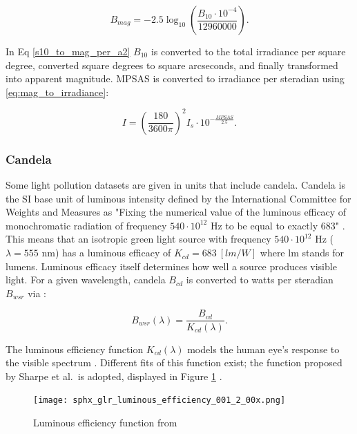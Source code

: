 \begin{equation} \label{s10_to_mag_per_a2}
	B_{mag} = -2.5 \log_{10}\left( \frac{B_{10} \cdot 10^{-4}}{12960000} \right).
\end{equation}

In Eq \ref{s10_to_mag_per_a2} $B_{10}$ is converted to the total irradiance per square degree,
converted square degrees to square arcseconds, and finally transformed into apparent magnitude. MPSAS is converted to irradiance per steradian using \ref{eq:mag_to_irradiance}:

\begin{equation} \label{eq:mpsas_to_irrad_per_ster}
  I = \left( \frac{180}{ 3600\pi} \right)^2 I_s \cdot 10^{-\frac{MPSAS}{2.5}}.
\end{equation}

\subsubsection{Candela} \label{sec:candela}

Some light pollution datasets are given in units that include candela. Candela is the SI base unit of luminous intensity defined by the International Committee for Weights and Measures as "Fixing the numerical value of the luminous efficacy of monochromatic radiation of frequency $540\cdot10^{12}$ Hz to be equal to exactly $683$" \cite{nist_units}. This means that an isotropic green light source with frequency $540\cdot10^{12}$ Hz ($\lambda = 555$ nm) has a luminous efficacy of $K_{cd} = 683 \: \left[ lm/W \right]$ where lm stands for lumens. Luminous efficacy itself determines how well a source produces visible light. For a given wavelength, candela $B_{cd}$ is converted to watts per steradian $B_{wsr}$ via \cite{nist_units}:

\begin{equation} \label{eq:cd_to_w_per_sr}
  B_{wsr}(\lambda) = \frac{B_{cd}}{K_{cd}(\lambda)}.
\end{equation}

The luminous efficiency function $K_{cd}(\lambda)$ models the human eye's response to the visible spectrum \cite{sharpe2005}. Different fits of this function exist; the function proposed by Sharpe et al.\ is adopted, displayed in Figure \ref{fig:luminous_efficiency} \cite{sharpe2005}.

\begin{figure}[ht]
  \centering
  \texttt{[image: sphx\_glr\_luminous\_efficiency\_001\_2\_00x.png]}
  \caption{Luminous efficiency function from \cite{sharpe2005}}
  \label{fig:luminous_efficiency}
\end{figure}

